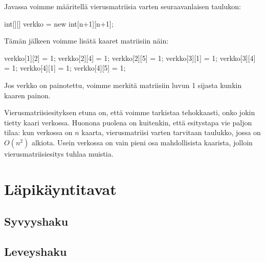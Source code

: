 Javassa voimme määritellä vierusmatriisia varten seuraavanlaisen taulukon:

\begin{code}
int[][] verkko = new int[n+1][n+1];
\end{code}

Tämän jälkeen voimme lisätä kaaret matriisiin näin:

\begin{code}
verkko[1][2] = 1;
verkko[2][4] = 1;
verkko[2][5] = 1;
verkko[3][1] = 1;
verkko[3][4] = 1;
verkko[4][1] = 1;
verkko[4][5] = 1;
\end{code}

Jos verkko on painotettu, voimme merkitä matriisiin luvun 1 sijasta
kunkin kaaren painon.

Vierusmatriisiesityksen etuna on, että voimme tarkistaa tehokkaasti,
onko jokin tietty kaari verkossa.
Huonona puolena on kuitenkin, että esitystapa vie paljon tilaa:
kun verkossa on $n$ kaarta, vierusmatriisi varten tarvitaan taulukko,
jossa on $O(n^2)$ alkiota.
Usein verkossa on vain pieni osa mahdollisista kaarista,
jolloin vierusmatriisiesitys tuhlaa muistia.

\section{Läpikäyntitavat}

\subsection{Syvyyshaku}

\subsection{Leveyshaku}

